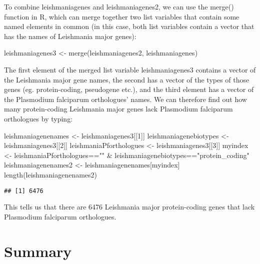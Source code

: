 \documentclass[
]{book}
\newenvironment{Shaded}{\begin{snugshade}}{\end{snugshade}}
\newcommand{\DecValTok}[1]{\textcolor[rgb]{0.00,0.00,0.81}{#1}}
\newcommand{\FunctionTok}[1]{\textcolor[rgb]{0.00,0.00,0.00}{#1}}
\newcommand{\NormalTok}[1]{#1}
\newcommand{\OtherTok}[1]{\textcolor[rgb]{0.56,0.35,0.01}{#1}}
\newcommand{\SpecialCharTok}[1]{\textcolor[rgb]{0.00,0.00,0.00}{#1}}
\newcommand{\StringTok}[1]{\textcolor[rgb]{0.31,0.60,0.02}{#1}}
\begin{document}
To combine leishmaniagenes and leishmaniagenes2, we can use the merge() function in R, which can merge together two list variables that contain some named elements in common (in this case, both list variables contain a vector that has the names of Leishmania major genes):

\begin{Shaded}
\begin{Highlighting}[]
\NormalTok{leishmaniagenes3 }\OtherTok{\textless{}{-}} \FunctionTok{merge}\NormalTok{(leishmaniagenes2, leishmaniagenes)}
\end{Highlighting}
\end{Shaded}

The first element of the merged list variable leishmaniagenes3 contains a vector of the Leishmania major gene names, the second has a vector of the types of those genes (eg. protein-coding, pseudogene etc.), and the third element has a vector of the Plasmodium falciparum orthologues' names. We can therefore find out how many protein-coding Leishmania major genes lack Plasmodium falciparum orthologues by typing:

\begin{Shaded}
\begin{Highlighting}[]
\NormalTok{leishmaniagenenames }\OtherTok{\textless{}{-}}\NormalTok{ leishmaniagenes3[[}\DecValTok{1}\NormalTok{]]}
\NormalTok{leishmaniagenebiotypes }\OtherTok{\textless{}{-}}\NormalTok{ leishmaniagenes3[[}\DecValTok{2}\NormalTok{]]}
\NormalTok{leishmaniaPforthologues }\OtherTok{\textless{}{-}}\NormalTok{ leishmaniagenes3[[}\DecValTok{3}\NormalTok{]]}
\NormalTok{myindex }\OtherTok{\textless{}{-}}\NormalTok{ leishmaniaPforthologues}\SpecialCharTok{==}\StringTok{""} \SpecialCharTok{\&}\NormalTok{ leishmaniagenebiotypes}\SpecialCharTok{==}\StringTok{"protein\_coding"}
\NormalTok{leishmaniagenenames2 }\OtherTok{\textless{}{-}}\NormalTok{ leishmaniagenenames[myindex]}
\FunctionTok{length}\NormalTok{(leishmaniagenenames2)}
\end{Highlighting}
\end{Shaded}

\begin{verbatim}
## [1] 6476
\end{verbatim}

This tells us that there are 6476 Leishmania major protein-coding genes that lack Plasmodium falciparum orthologues.

\hypertarget{summary-6}{%
\chapter{Summary}\label{summary-6}}
\end{document}
